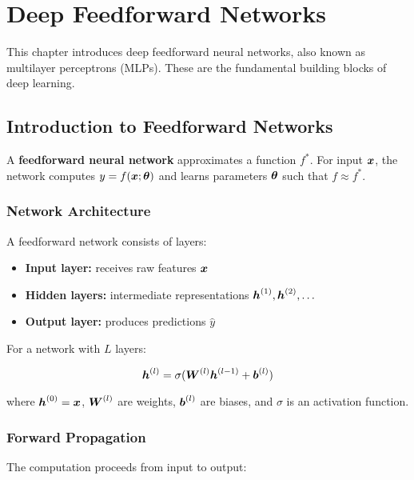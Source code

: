 
\chapter{Deep Feedforward Networks}
\label{chap:feedforward-networks}

This chapter introduces deep feedforward neural networks, also known as multilayer perceptrons (MLPs). These are the fundamental building blocks of deep learning.

\section{Introduction to Feedforward Networks}
\label{sec:intro-feedforward}

A \textbf{feedforward neural network} approximates a function $f^*$. For input $\boldsymbol{x}$, the network computes $y = f(\boldsymbol{x}; \boldsymbol{\theta})$ and learns parameters $\boldsymbol{\theta}$ such that $f \approx f^*$.

\subsection{Network Architecture}

A feedforward network consists of layers:
\begin{itemize}
    \item \textbf{Input layer:} receives raw features $\boldsymbol{x}$
    \item \textbf{Hidden layers:} intermediate representations $\boldsymbol{h}^{(1)}, \boldsymbol{h}^{(2)}, \ldots$
    \item \textbf{Output layer:} produces predictions $\hat{y}$
\end{itemize}

For a network with $L$ layers:

\begin{equation}
\boldsymbol{h}^{(l)} = \sigma(\boldsymbol{W}^{(l)} \boldsymbol{h}^{(l-1)} + \boldsymbol{b}^{(l)})
\end{equation}

where $\boldsymbol{h}^{(0)} = \boldsymbol{x}$, $\boldsymbol{W}^{(l)}$ are weights, $\boldsymbol{b}^{(l)}$ are biases, and $\sigma$ is an activation function.

\subsection{Forward Propagation}

The computation proceeds from input to output:

